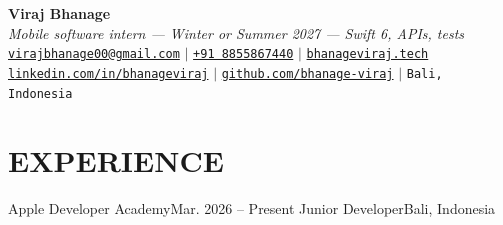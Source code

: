 


\begin{center}
    \textbf{\Huge Viraj Bhanage} \\ \vspace{4pt}
    {\small\textit{Mobile software intern --- Winter or Summer 2027 --- Swift 6, APIs, tests}} \\ \vspace{4pt}
    \small
    \faEnvelope \hspace{2pt} \href{mailto:virajbhanage00@gmail.com}{\texttt{virajbhanage00@gmail.com}} \hspace{1pt} $|$
    \hspace{1pt} \faPhone \hspace{2pt} \href{tel:+918855867440}{\texttt{+91 8855867440}} \hspace{1pt} $|$
    \hspace{1pt} \href{https://www.bhanageviraj.tech}{\texttt{bhanageviraj.tech}} \\
    \faLinkedin \hspace{2pt} \href{https://www.linkedin.com/in/bhanageviraj/}{\texttt{linkedin.com/in/bhanageviraj}} \hspace{1pt} $|$
    \hspace{1pt} \faGithub \hspace{2pt} \href{https://github.com/bhanage-viraj}{\texttt{github.com/bhanage-viraj}} \hspace{1pt} $|$
    \hspace{1pt} \faMapMarker* \hspace{2pt}\texttt{Bali, Indonesia}
\end{center}

\section{EXPERIENCE}
  \resumeSubHeadingListStart
    \resumeSubheading
      {Apple Developer Academy}{Mar. 2026 -- Present}
      {Junior Developer}{Bali, Indonesia}
      \resumeItemListStart
      \resumeItemListEnd
  \resumeSubHeadingListEnd

